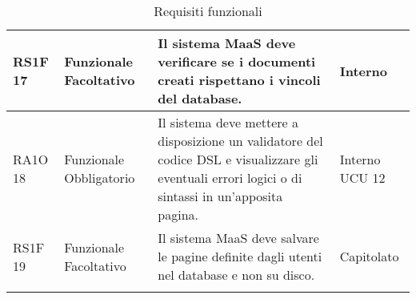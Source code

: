 \begin{center}
\begin{longtable}{ | l | p{2cm} | p{5cm} | p{1.7cm} |}
				RS1F 17 & Funzionale \newline  Facoltativo  & Il sistema MaaS deve verificare se i documenti creati rispettano i vincoli del database. &  Interno \newline  \\ \hline      
				RA1O 18 & Funzionale \newline  Obbligatorio  & Il sistema deve mettere a disposizione un validatore del codice DSL e visualizzare gli eventuali errori logici o di sintassi in un'apposita pagina. &  Interno \newline  UCU 12 \newline  \\ \hline      
				RS1F 19 & Funzionale \newline  Facoltativo  & Il sistema MaaS deve salvare le pagine definite dagli utenti nel database e non su disco. &  Capitolato \newline  \\ \hline
			\caption{Requisiti funzionali}
			\end{longtable}
			\egroup
			\end{center}  
